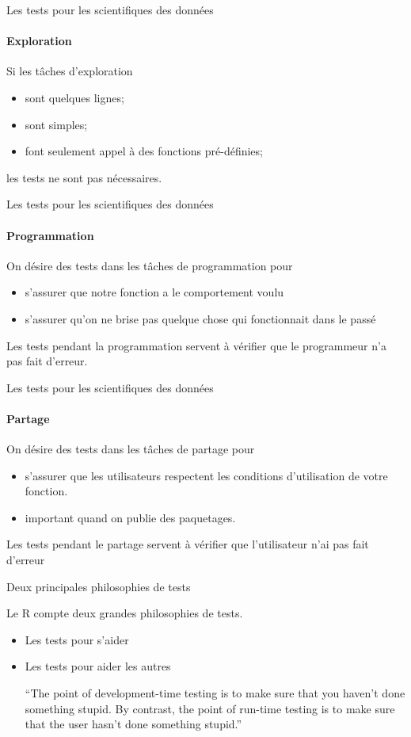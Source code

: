 \documentclass[11pt]{beamer}
\begin{document}
\begin{frame}{Les tests pour les scientifiques des données}
\framesubtitle{Exploration}
Si les tâches d'exploration
\begin{itemize}
\item sont quelques lignes;
\item sont simples;
\item font seulement appel à des fonctions pré-définies;
\end{itemize}
les tests ne sont pas nécessaires.
\end{frame}

\begin{frame}{Les tests pour les scientifiques des données}
\framesubtitle{Programmation}
On désire des tests dans les tâches de programmation pour 
\begin{itemize}
\item s'assurer que notre fonction a le comportement voulu
\item s'assurer qu'on ne brise pas quelque chose qui fonctionnait dans le passé
\end{itemize}
Les tests pendant la programmation servent à vérifier que le programmeur n'a pas fait d'erreur. 
\end{frame}

\begin{frame}{Les tests pour les scientifiques des données}
\framesubtitle{Partage}
On désire des tests dans les tâches de partage pour 
\begin{itemize}
\item s'assurer que les utilisateurs respectent les conditions d'utilisation de votre fonction.
\item important quand on publie des paquetages.
\end{itemize}
Les tests pendant le partage servent à vérifier que l'utilisateur n'ai pas fait d'erreur
\end{frame}

\begin{frame}{Deux principales philosophies de tests}

Le \textsf{R} compte deux grandes philosophies de tests. 

\begin{itemize}
\item Les tests pour s'aider
\item Les tests pour aider les autres
\begin{block}{}
{\large ``The point of development-time testing is to make sure that you
haven’t done something stupid. By contrast, the point of run-time
testing is to make sure that the user hasn’t done something stupid.''}
\vskip5mm
\hspace*{}
\end{block}

\end{itemize}
\end{frame}
\end{document}
